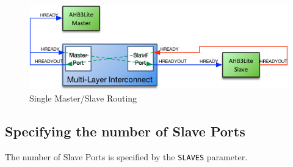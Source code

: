 \begin{figure}[htb]
	\centering
	\includegraphics{assets/img/ahb-lite-switch-sys5}
	\caption{Single Master/Slave Routing}
	\label{fig:master-slave-routing}
\end{figure}

\newpage

\subsection{Specifying the number of Slave
Ports}\label{specifying-the-number-of-slave-ports}

The number of Slave Ports is specified by the \texttt{SLAVES} parameter.
